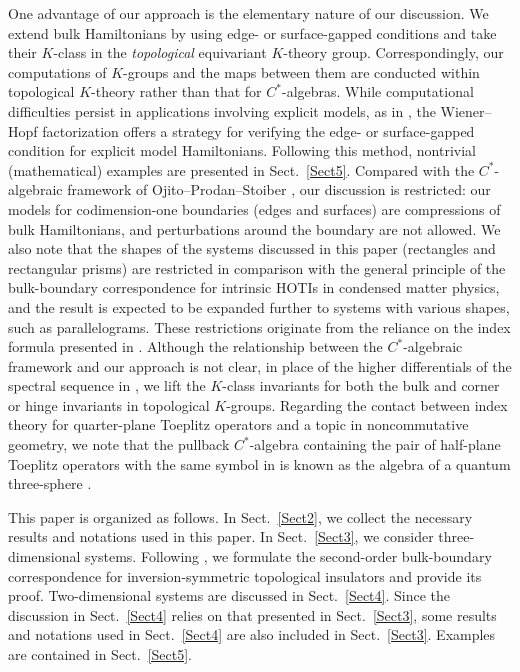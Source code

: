 \documentclass{amsart}
\theoremstyle{plain}
\theoremstyle{definition}
\theoremstyle{remark}
\begin{document}
One advantage of our approach is the elementary nature of our discussion.
We extend bulk Hamiltonians by using edge- or surface-gapped conditions and take their $K$-class in the {\em topological} equivariant $K$-theory group.
Correspondingly, our computations of $K$-groups and the maps between them are conducted within topological $K$-theory rather than that for $C^*$-algebras.
While computational difficulties persist in applications involving explicit models, as in \cite{Hayashi5}, the Wiener--Hopf factorization offers a strategy for verifying the edge- or surface-gapped condition for explicit model Hamiltonians.
Following this method, nontrivial (mathematical) examples are presented in Sect.~\ref{Sect5}.
Compared with the $C^*$-algebraic framework of Ojito--Prodan--Stoiber \cite{OPS24a}, our discussion is restricted: our models for codimension-one boundaries (edges and surfaces) are compressions of bulk Hamiltonians, and perturbations around the boundary are not allowed.
We also note that the shapes of the systems discussed in this paper (rectangles and rectangular prisms) are restricted in comparison with the general principle of the bulk-boundary correspondence for intrinsic HOTIs in condensed matter physics, and the result is expected to be expanded further to systems with various shapes, such as parallelograms.
These restrictions originate from the reliance on the index formula presented in \cite{Hayashi5}.
Although the relationship between the $C^*$-algebraic framework \cite{OPS24a} and our approach is not clear, in place of the higher differentials of the spectral sequence in \cite{OPS24a}, we lift the $K$-class invariants for both the bulk and corner or hinge invariants in topological $K$-groups.
Regarding the contact between index theory for quarter-plane Toeplitz operators and a topic in noncommutative geometry,
we note that the pullback $C^*$-algebra containing the pair of half-plane Toeplitz operators with the same symbol in \cite{Pa90} is known as the algebra of a quantum three-sphere \cite{BHMS05}.

This paper is organized as follows.
In Sect.~\ref{Sect2}, we collect the necessary results and notations used in this paper.
In Sect.~\ref{Sect3}, we consider three-dimensional systems.
Following \cite{TTM20a}, we formulate the second-order bulk-boundary correspondence for inversion-symmetric topological insulators and provide its proof.
Two-dimensional systems are discussed in Sect.~\ref{Sect4}.
Since the discussion in Sect.~\ref{Sect4} relies on that presented in Sect.~\ref{Sect3}, some results and notations used in Sect.~\ref{Sect4} are also included in Sect.~\ref{Sect3}.
Examples are contained in Sect.~\ref{Sect5}.
\end{document}
